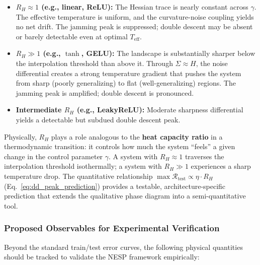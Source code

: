\documentclass[
  journal=largetwo,
  simfonts=false,
  year=2025,
  volume=37,
]{cup-journal}
\begin{document}
\begin{itemize}
    \item \textbf{$R_H \approx 1$ (e.g., linear, ReLU):} The Hessian trace is nearly constant across $\gamma$. The effective temperature is uniform, and the curvature-noise coupling yields no net drift. The jamming peak is suppressed; double descent may be absent or barely detectable even at optimal $T_{\mathrm{eff}}$.

    \item \textbf{$R_H \gg 1$ (e.g., $\tanh$, GELU):} The landscape is substantially sharper below the interpolation threshold than above it. Through $\Sigma \approx H$, the noise differential creates a strong temperature gradient that pushes the system from sharp (poorly generalizing) to flat (well-generalizing) regions. The jamming peak is amplified; double descent is pronounced.

    \item \textbf{Intermediate $R_H$ (e.g., LeakyReLU):} Moderate sharpness differential yields a detectable but subdued double descent peak.
\end{itemize}

\noindent Physically, $R_H$ plays a role analogous to the \textbf{heat capacity ratio} in a thermodynamic transition: it controls how much the system ``feels'' a given change in the control parameter $\gamma$. A system with $R_H \approx 1$ traverses the interpolation threshold isothermally; a system with $R_H \gg 1$ experiences a sharp temperature drop. The quantitative relationship $\max \mathcal{R}_{\mathrm{test}} \propto \eta \cdot R_H$ (Eq.~\ref{eq:dd_peak_prediction}) provides a testable, architecture-specific prediction that extends the qualitative phase diagram into a semi-quantitative tool.

\subsubsection{Proposed Observables for Experimental Verification}

Beyond the standard train/test error curves, the following physical quantities should be tracked to validate the NESP framework empirically:
\end{document}
